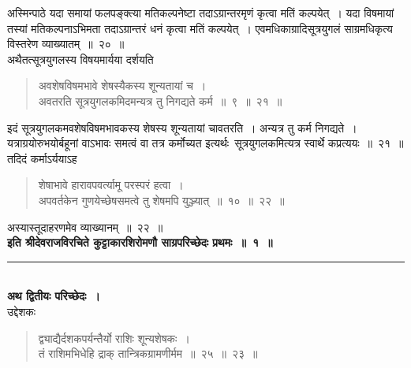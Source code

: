 \documentclass[11pt, openany]{book}
\begin{document}
\indent
अस्मिन्पाठे यदा समायां फलपङ्क्त्या मतिकल्पनेष्टा तदाऽग्रान्तरमृणं कृत्वा मतिं कल्पयेत्~। यदा विषमायां तस्यां मतिकल्पनाऽभिमता तदाऽग्रान्तरं धनं कृत्वा मतिं कल्पयेत्~। एवमधिकाग्रादिसूत्रयुगलं साग्रमधिकृत्य विस्तरेण व्याख्यातम्~॥~२०~॥\\
अथैतत्सूत्रयुगलस्य विषयमार्यया दर्शयति \textendash

\begin{quote}
{\ks अवशेषविषमभावे शेषस्यैकस्य शून्यतायां च~।\\
अवतरति सूत्रयुगलकमिदमन्यत्र तु निगद्यते कर्म~॥~९~॥~२१~॥}
\end{quote}

\indent
इदं सूत्रयुगलकमवशेषविषमभावकस्य शेषस्य शून्यतायां चावतरति~। अन्यत्र तु कर्म निगद्यते~। यत्राग्रयोरुभयोर्बहूनां वाऽभावः समत्वं वा तत्र कर्मोच्यत इत्यर्थः\textendash\ सूत्रयुगलकमित्यत्र स्वार्थे कप्रत्ययः~॥~२१~॥\\
\indent
तदिदं कर्माऽर्ययाऽह \textendash
\begin{quote}
{\ks शेषाभावे हारावपवर्त्यामू परस्परं हत्वा~।\\
अपवर्तकेन गुणयेच्छेषसमत्वे तु शेषमपि युञ्ज्यात्~॥~१०~॥~२२~॥}
\end{quote}
अस्यास्तूदाहरणमेव व्याख्यानम्~॥~२२~॥\\

\indent
\centering
\textbf{इति श्रीदेवराजविरचिते कुट्टाकारशिरोमणौ साग्रपरिच्छेदः प्रथमः~॥~१~॥\\}
\rule{0.2\linewidth}{1.0pt}\\
\vspace{1cm}
\textbf{अथ द्वितीयः परिच्छेदः~।\\}
\justifying
\indent
उद्देशकः \textendash\begin{quote}
{\ks द्व्याद्यैर्दशकपर्यन्तैर्यो राशिः शून्यशेषकः~।\\
तं राशिमभिधेहि द्राक् तान्त्रिकग्रामणीर्मम~॥~२५~॥~२३~॥}
\end{quote}


\newpage
\thispagestyle{fancy}
\fancyhf{}
\end{document}
